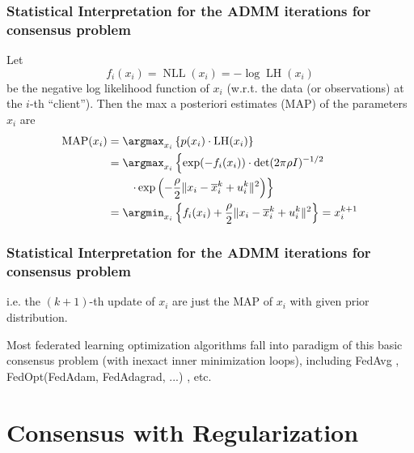 
\begin{frame}
\frametitle{{\bfseries Statistical Interpretation} for the ADMM iterations for consensus problem}

Let
$$f_i(x_i) = \operatorname{NLL}(x_i) = -\log\operatorname{LH}(x_i)$$
be the negative log likelihood function of $x_i$ (w.r.t. the data (or observations) at the $i$-th ``client''). Then the max a posteriori estimates (MAP) of the parameters $x_i$ are
\begin{align*}
    \operatorname{MAP}(x_i) & = \argmax_{x_i} \left\{ p(x_i) \cdot \operatorname{LH}(x_i) \right\} \\
    & = \argmax_{x_i} \left\{ \exp(-f_i(x_i)) \cdot \det(2\pi\rho I)^{-1/2} \right. \\
    & \qquad \left. \cdot \exp\left( -\dfrac{\rho}{2} \lVert x_i - \overline{x}_i^k + u_i^k \rVert^2 \right) \right\} \\
    & = \argmin_{x_i} \left\{ f_i(x_i) + \dfrac{\rho}{2} \lVert x_i - \overline{x}_i^k + u_i^k \rVert^2 \right\} = x_i^{k+1}
\end{align*}

\end{frame}


\begin{frame}
\frametitle{{\bfseries Statistical Interpretation} for the ADMM iterations for consensus problem}

i.e. the $(k+1)$-th update of $x_i$ are just the MAP of $x_i$ with given prior distribution.

\vspace{1em}

\begin{remark}
Most federated learning optimization algorithms fall into paradigm of this basic consensus problem (with inexact inner minimization loops), including FedAvg \cite{mcmahan2017fed_avg}, FedOpt(FedAdam, FedAdagrad, ...) \cite{reddi2020fed_opt}, etc.
\end{remark}

\end{frame}


\section[Consensus with Regularization]{Consensus with Regularization}

